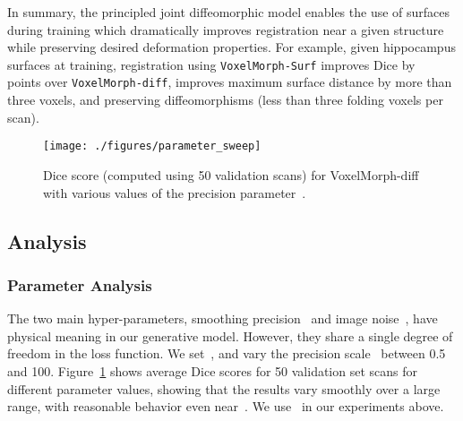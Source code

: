 \documentclass{article}
\begin{document}
	
	
	In summary, the principled joint diffeomorphic model enables the use of surfaces during training which dramatically improves registration near a given structure while preserving desired deformation properties. For example, given hippocampus surfaces at training, registration using \verb|VoxelMorph-Surf| improves Dice by~ points over \verb|VoxelMorph-diff|, improves maximum surface distance by more than three voxels, and preserving diffeomorphisms (less than three folding voxels per scan).
	













\begin{figure}[t!]
	\centering
	\texttt{[image: ./figures/parameter\_sweep]}
	\caption{Dice score (computed using 50 validation scans) for VoxelMorph-diff with various values of the precision parameter~.}
	\label{fig:sweep}
\end{figure}










\subsection{Analysis}




\subsubsection{Parameter Analysis} 
The two main hyper-parameters, smoothing precision~ and image noise~, have physical meaning in our generative model. However, they share a single degree of freedom in the loss function.  We set~, and vary the precision scale~ between 0.5 and 100. Figure~\ref{fig:sweep} shows average Dice scores for 50 validation set scans for different parameter values, showing that the results vary smoothly over a large range, with reasonable behavior even near~. We use~ in our experiments above. 
\end{document}
